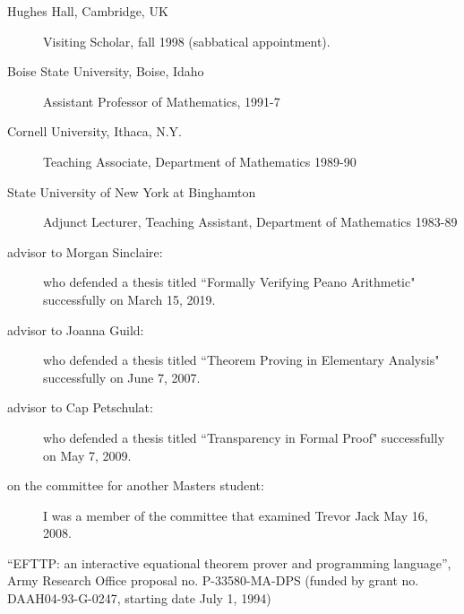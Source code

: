 \begin{description}
\begin{description}
		\item[Hughes Hall, Cambridge, UK]  Visiting Scholar, fall 1998 (sabbatical appointment).
 
                \item[Boise State University, Boise, Idaho] Assistant Professor of
Mathematics, 1991-7
                \item[Cornell University, Ithaca, N.Y.] Teaching Associate, Department
of Mathematics 1989-90
                \item[State University of New York at Binghamton] Adjunct Lecturer,
Teaching Assistant, Department of Mathematics 1983-89
        \end{description}

\newpage



\item[Masters Students Supervised:]

\begin{description}

\item[]

\item[advisor to Morgan Sinclaire:]  who defended a thesis titled ``Formally Verifying Peano Arithmetic" successfully on March 15, 2019.

\item[advisor to Joanna Guild:]  who defended a thesis titled ``Theorem Proving in Elementary Analysis" successfully on June 7, 2007.

\item[advisor to Cap Petschulat:]  who defended a thesis titled ``Transparency in Formal Proof" successfully on May 7, 2009.

\item[on the committee for another Masters student:]  I was a member of the committee that examined Trevor Jack  May 16, 2008.

\end{description}

\newpage



\newpage

\item[Research Grants]
\begin{description}
\item
\item[1.] ``EFTTP: an interactive equational theorem prover and programming
language'', Army Research Office proposal no.  P-33580-MA-DPS (funded
by grant no.  DAAH04-93-G-0247, starting date July 1, 1994)


\end{description}
\end{description}
